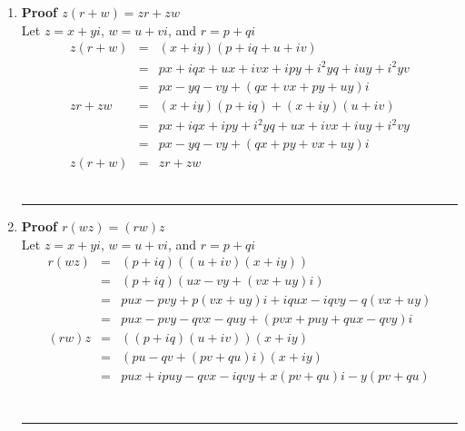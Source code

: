 \documentclass{article}%
\newenvironment{proof}[1][]{\textbf{Proof #1} }{\ \rule{0.5em}{0.5em}}
\begin{document}
\begin{enumerate}
\begin{enumerate}[label*=\arabic*.]
\begin{enumerate}[label=\alph*]
\begin{proof}[$zw=wz$]
\begin{eqnarray*}
                      &=&ux+xvi+yui+yvi^2 \\
                      &=&ux-vy+(vx+uy)i \\
                    wz&=&(u+iv)(x+iy) \\
                      &=&ux+iuy+ivx+vyi^2 \\
                      &=&ux-vy+(vx+uy)i \\
                    zw&=&wz
                \end{eqnarray*}
            \end{proof}
            \item
            \begin{proof}[$z(r+w)=zr+zw$]
                \\ Let $z=x+yi$, $w=u+vi$, and $r=p+qi$
                \begin{eqnarray*}
                    z(r+w)&=&(x+iy)(p+iq+u+iv) \\
                          &=&px+iqx+ux+ivx+ipy+i^2yq+iuy+i^2yv \\
                          &=&px-yq-vy+(qx+vx+py+uy)i \\
                    zr+zw &=&(x+iy)(p+iq)+(x+iy)(u+iv) \\
                          &=&px+iqx+ipy+i^2yq+ux+ivx+iuy+i^2vy \\
                          &=&px-yq-vy+(qx+py+vx+uy)i \\
                    z(r+w)&=&zr+zw
                \end{eqnarray*}
            \end{proof}
            \item
            \begin{proof}[$r(wz)=(rw)z$]
                \\ Let $z=x+yi$, $w=u+vi$, and $r=p+qi$
                \begin{eqnarray*}
                    r(wz)&=&(p+iq)((u+iv)(x+iy)) \\
                         &=&(p+iq)(ux-vy+(vx+uy)i) \\
                         &=&pux-pvy+p(vx+uy)i+iqux-iqvy-q(vx+uy) \\
                         &=&pux-pvy-qvx-quy+(pvx+puy+qux-qvy)i \\
                    (rw)z&=&((p+iq)(u+iv))(x+iy) \\
                         &=&(pu-qv+(pv+qu)i)(x+iy) \\
                         &=&pux+ipuy-qvx-iqvy+x(pv+qu)i-y(pv+qu) \\

\end{eqnarray*}
\end{proof}
\end{enumerate}
\end{enumerate}
\end{enumerate}
\end{document}
